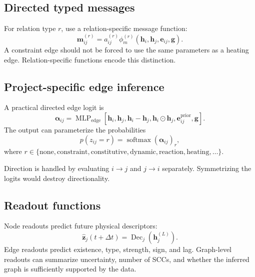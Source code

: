 \documentclass[11pt]{article}
\newcommand{\hvec}{\bm{h}}
\newcommand{\mvec}{\bm{m}}
\newcommand{\evec}{\bm{e}}
\newcommand{\gvec}{\bm{g}}
\newcommand{\zvec}{\bm{z}}
\newcommand{\softmax}{\operatorname{softmax}}
\newcommand{\MLP}{\operatorname{MLP}}
\newcommand{\Dec}{\operatorname{Dec}}
\newcommand{\dt}{\Delta t}
\begin{document}
\subsection{Directed typed messages}

For relation type \(r\), use a relation-specific message function:
\begin{equation}
\mvec_{ij}^{(r)}=a_{ij}^{(r)}\phi_m^{(r)}\left(\hvec_i,\hvec_j,\evec_{ij},\gvec\right).
\end{equation}
A constraint edge should not be forced to use the same parameters as a heating edge. Relation-specific functions encode this distinction.

\subsection{Project-specific edge inference}

A practical directed edge logit is
\begin{equation}
\bm{\alpha}_{ij}
=\MLP_{\mathrm{edge}}\left[
\hvec_i,
\hvec_j,
\hvec_i-\hvec_j,
\hvec_i\odot\hvec_j,
\evec_{ij}^{\mathrm{prior}},
\gvec
\right].
\label{eq:edge_logits}
\end{equation}
The output can parameterize the probabilities
\begin{equation}
p(z_{ij}=r)=\softmax(\bm{\alpha}_{ij})_r,
\end{equation}
where \(r\in\{\text{none},\text{constraint},\text{constitutive},\text{dynamic},\text{reaction},\text{heating},\ldots\}\).

Direction is handled by evaluating \(i\rightarrow j\) and \(j\rightarrow i\) separately. Symmetrizing the logits would destroy directionality.

\subsection{Readout functions}

Node readouts predict future physical descriptors:
\begin{equation}
\widehat{\zvec}_j(t+\dt)=\Dec_j\left(\hvec_j^{(L)}\right).
\end{equation}
Edge readouts predict existence, type, strength, sign, and lag. Graph-level readouts can summarize uncertainty, number of SCCs, and whether the inferred graph is sufficiently supported by the data.
\end{document}
